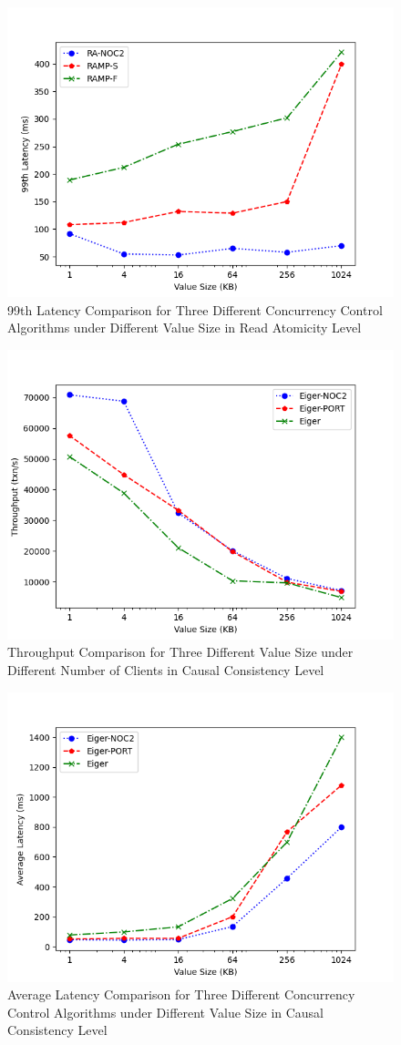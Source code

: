 \begin{figure}[H]
    \centering
    \includegraphics[width=0.8\linewidth]{figure/5-ra-l.png}
    \caption{99th Latency Comparison for Three Different Concurrency Control Algorithms under Different Value Size in Read Atomicity Level}
    \label{fig:21}
\end{figure}
\begin{figure}[H]
    \centering
    \includegraphics[width=0.8\linewidth]{figure/5-tcc-t.png}
    \caption{Throughput Comparison for Three Different Value Size under Different Number of Clients in Causal Consistency Level}
    \label{fig:22}
\end{figure}
\begin{figure}[H]
    \centering
    \includegraphics[width=0.8\linewidth]{figure/5-tcc-al.png}
    \caption{Average Latency Comparison for Three Different Concurrency Control Algorithms under Different Value Size in Causal Consistency Level}
    \label{fig:23}
\end{figure}
